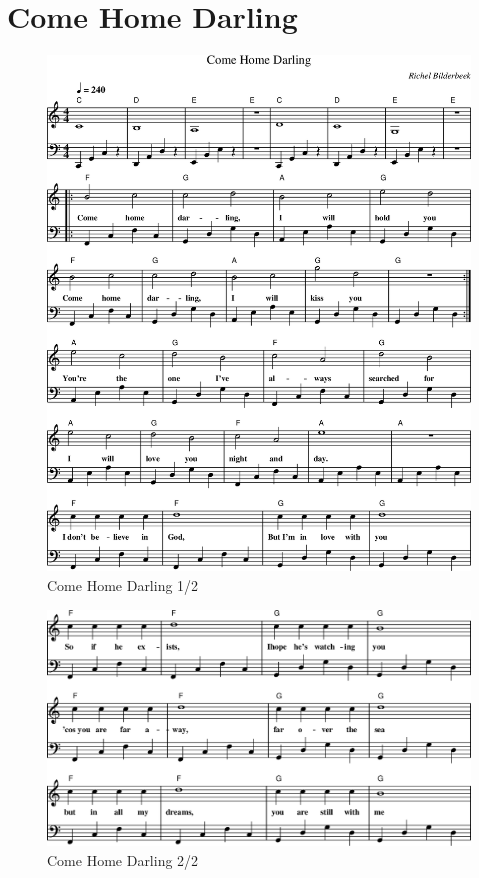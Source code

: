 \chapter{Come Home Darling}



\begin{figure}[!htbp]
  \includegraphics[width=\textwidth,height=\textheight,keepaspectratio]{../songs/14_come_home_darling-0.png}
  \caption{Come Home Darling 1/2}
  \label{fig:14_come_home_darling_1}
\end{figure}

\begin{figure}[!htbp]
  \includegraphics[width=\textwidth,height=\textheight,keepaspectratio]{../songs/14_come_home_darling-1.png}
  \caption{Come Home Darling 2/2}
  \label{fig:14_come_home_darling_2}
\end{figure}
